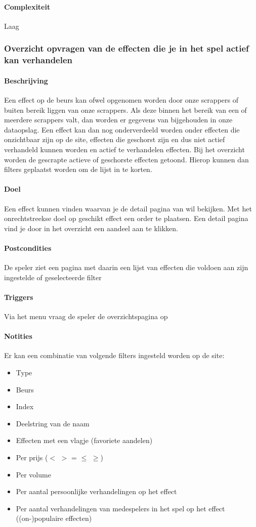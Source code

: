 \paragraph{Complexiteit}Laag


\subsubsection{Overzicht opvragen van de effecten die je in het spel actief kan verhandelen}
\paragraph{Beschrijving} Een effect op de beurs kan ofwel opgenomen worden door onze scrappers of buiten bereik liggen van onze scrappers.
Als deze binnen het bereik van een of meerdere scrappers valt, dan worden er gegevens van bijgehouden in onze dataopslag. Een effect kan dan nog onderverdeeld worden onder effecten die onzichtbaar zijn op de site, effecten die geschorst zijn en dus niet actief verhandeld kunnen worden en actief te verhandelen effecten. Bij het overzicht worden de gescrapte actieve of geschorste effecten getoond. Hierop kunnen dan filters geplaatst worden om de lijst in te korten.
\paragraph{Doel} Een effect kunnen vinden waarvan je de detail pagina van wil bekijken. Met het onrechtstreekse doel op geschikt effect een order te plaatsen. Een detail pagina vind je door in het overzicht een aandeel aan te klikken.
\paragraph{Postcondities} De speler ziet een pagina met daarin een lijst van effecten die voldoen aan zijn ingestelde of geselecteerde filter
\paragraph{Triggers} Via het menu vraag de speler de overzichtspagina op\paragraph{Notities} Er kan een combinatie van volgende filters ingesteld worden op de site:

\begin{itemize}
	\item Type
	\item Beurs
	\item Index
	\item Deelstring van de naam
	\item Effecten met een vlagje (favoriete aandelen)
	\item Per prijs ($<$ $>$ = $\leq$ $\geq$)
	\item Per volume
	\item Per aantal persoonlijke verhandelingen op het effect
	\item Per aantal verhandelingen van medespelers in het spel op het effect ((on-)populaire effecten)
\end{itemize}

